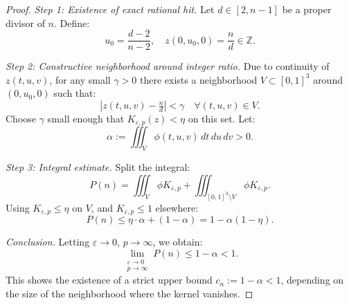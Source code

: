 \documentclass[10pt,a4paper]{amsart}
\begin{document}
\begin{proof}
\textit{Step 1: Existence of exact rational hit.}  
Let \( d \in [2,n-1] \) be a proper divisor of \( n \). Define:
\[
u_0 = \frac{d - 2}{n - 2}, \quad z(0,u_0,0) = \frac{n}{d} \in \mathbb{Z}.
\]

\textit{Step 2: Constructive neighborhood around integer ratio.}  
Due to continuity of \( z(t,u,v) \), for any small \( \gamma > 0 \) there exists a neighborhood \( V \subset [0,1]^3 \) around \( (0, u_0, 0) \) such that:
\[
|z(t,u,v) - \tfrac{n}{d}| < \gamma \quad \forall (t,u,v) \in V.
\]
Choose \( \gamma \) small enough that \( K_{\varepsilon,p}(z) < \eta \) on this set. Let:
\[
\alpha := \iiint_V \phi(t,u,v) \, dt\,du\,dv > 0.
\]

\textit{Step 3: Integral estimate.}  
Split the integral:
\[
P(n) = \iiint_V \phi K_{\varepsilon,p} + \iiint_{[0,1]^3 \setminus V} \phi K_{\varepsilon,p}.
\]
Using \( K_{\varepsilon,p} \leq \eta \) on \( V \), and \( K_{\varepsilon,p} \leq 1 \) elsewhere:
\[
P(n) \leq \eta \cdot \alpha + (1 - \alpha) = 1 - \alpha(1 - \eta).
\]

\textit{Conclusion.}  
Letting \( \varepsilon \to 0 \), \( p \to \infty \), we obtain:
\[
\lim_{\substack{\varepsilon \to 0 \\ p \to \infty}} P(n) \leq 1 - \alpha < 1.
\]
This shows the existence of a strict upper bound \( c_n := 1 - \alpha < 1 \), depending on the size of the neighborhood where the kernel vanishes. 
\end{proof}
\end{document}
